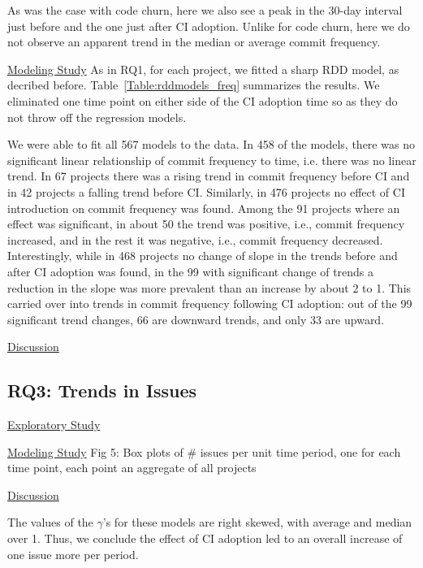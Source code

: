 \documentclass[conference]{IEEEtran}
\begin{document}
As was the case with code churn, here we also see a peak in the 30-day interval just before and the one just after CI adoption.
Unlike for code churn, here we do not observe an apparent trend in the median or average commit frequency.

\noindent \underline{Modeling Study} 
As in RQ1, for each project, we fitted a sharp RDD model, as decribed before.
Table~\ref{Table:rddmodels_freq} summarizes the results.
We eliminated one time point on either side of the CI adoption time so as they do not throw off the regression models.


We were able to fit all 567 models to the data.
In 458 of the models, there was no significant linear relationship of commit frequency to time, i.e. there was no linear trend.
In 67 projects there was a rising trend in commit frequency before CI and in 42 projects a falling trend before CI.
Similarly, in 476 projects no effect of CI introduction on commit frequency was found. Among the 91 projects where an effect was significant, in about 50 the trend was positive, i.e., commit frequency increased, and in the rest it was negative, i.e., commit frequency decreased.
Interestingly, while in 468 projects no change of slope in the trends before and after CI adoption was found, in the 99 with significant change of trends a reduction in the slope was more prevalent than an increase by about 2 to 1.
This carried over into trends in commit frequency following CI adoption: out of the 99 significant trend changes, 66 are downward trends, and only 33 are upward.

\noindent \underline{Discussion}




\subsection{RQ3: Trends in Issues}

\noindent \underline{Exploratory Study}


\noindent \underline{Modeling Study}
Fig 5: Box plots of \# issues per unit time period, one for each time point, each point an aggregate of all projects


\noindent \underline{Discussion}


The values of the $\gamma$'s for these models are right skewed, with average and median over 1. Thus, we conclude the effect of CI adoption led to an overall increase of one issue more per period.
\end{document}
